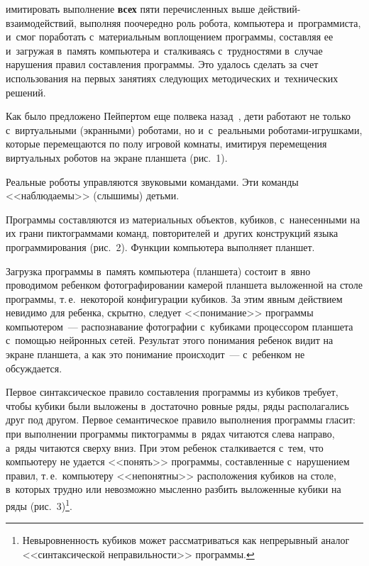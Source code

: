 \begin{multicols}{2}
  
  \noindent 
  ими\-ти\-ро\-вать выполнение \textbf{всех} пяти перечисленных
выше действий-взаимодействий, выполняя поочередно роль робота, 
компьютера и~программиста, и~смог поработать с~материальным воплощением 
программы, составляя ее и~загружая в~память компьютера и~сталкиваясь 
с~трудностями в~случае нарушения правил составления программы. Это 
удалось сделать за счет использования на первых занятиях следующих 
методических и~технических решений.
  
  Как было предложено Пейпертом еще полвека назад~\cite{8-bet}, дети 
работают не только с~виртуальными (экранными) роботами, но и~с~реальными  
ро\-бо\-та\-ми-иг\-руш\-ка\-ми, которые перемещаются по полу игровой 
комнаты, имитируя перемещения виртуальных роботов на экране планшета 
(рис.~1). 
  
  
   
Реальные роботы управляются звуковыми командами. Эти команды 
<<наблюдаемы>> (слышимы) детьми. 

  Программы составляются из материальных объектов, кубиков, 
с~нанесенными на их грани пикто\-грам\-ма\-ми команд, повторителей и~других 
конст\-рук\-ций языка программирования (рис.~2). \mbox{Функции} компьютера 
выполняет планшет.
  
    




  Загрузка программы в~память компьютера (планшета) состоит в~явно 
проводимом ребенком фотографировании камерой планшета выложенной на 
столе программы, т.\,е.\ некоторой конфигурации кубиков. За этим явным 
действием невидимо для ребенка, скрытно, следует <<понимание>> программы 
компьютером~--- распознавание фотографии с~кубиками процессором 
планшета с~помощью нейронных сетей. Результат этого понимания ребенок 
видит на экране планшета, а как это понимание происходит~--- с~ребенком не 
обсуждается.
  
  
  
  
  Первое синтаксическое правило составления программы из кубиков требует, 
чтобы кубики были выложены в~достаточно ровные ряды, ряды располагались 
друг под другом. Первое семантическое правило выполнения программы 
гласит: при выполнении программы пиктограммы в~рядах читаются слева 
направо, а~ряды читаются сверху вниз. 
  При этом ребенок сталкивается с~тем, что компьютеру не удается <<понять>> 
программы, со\-став\-лен\-ные с~нарушением правил, т.\,е.\ компьютеру 
<<непонятны>> расположения кубиков на столе, в~которых трудно или 
невозможно мысленно разбить выложенные кубики на ряды 
(рис.~3)\footnote{Невыровненность кубиков может рассматриваться как непрерывный аналог 
<<синтаксической неправильности>> программы.}.
  

\end{multicols}
